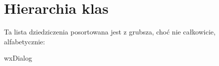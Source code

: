 \section{Hierarchia klas}
Ta lista dziedziczenia posortowana jest z grubsza, choć nie całkowicie, alfabetycznie\+:\begin{DoxyCompactList}
\item {}
\item {}
\item {}
\item {}
\item wx\+Dialog\begin{DoxyCompactList}
\item {}
\end{DoxyCompactList}
\end{DoxyCompactList}
